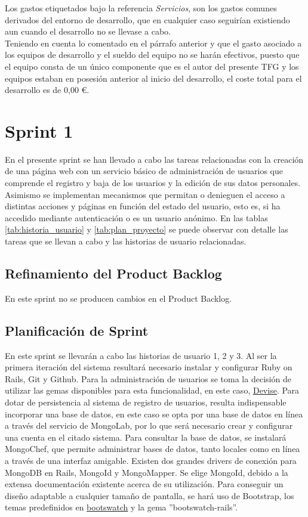 Los gastos etiquetados bajo la referencia \textit{Servicios}, son los gastos comunes derivados del entorno de desarrollo, que en cualquier caso seguirían existiendo aun cuando el desarrollo no se llevase a cabo.
\\Teniendo en cuenta lo comentado en el párrafo anterior y que el gasto asociado a los equipos de desarrollo y el sueldo del equipo no se harán efectivos, puesto que el equipo consta de un único componente que es el autor del presente \ac{TFG} y los equipos estaban en posesión anterior al inicio del desarrollo, el coste total para el desarrollo es de 0,00 \euro.


\section{Sprint 1}
En el presente sprint se han llevado a cabo las tareas relacionadas con la creación de una página web con un servicio básico de administración de usuarios que comprende el registro y baja de los usuarios y la edición de sus datos personales. Asimismo se implementan mecanismos que permitan o denieguen el acceso a distintas acciones y páginas en función del estado del usuario, esto es, si ha accedido mediante autenticación o es un usuario anónimo. En las tablas \ref{tab:historia_usuario} y \ref{tab:plan_proyecto} se puede observar con detalle las tareas que se llevan a cabo y las historias de usuario relacionadas.

	\subsection{Refinamiento del Product Backlog}
	En este sprint no se producen cambios en el Product Backlog.
	
	\subsection{Planificación de Sprint}
	En este sprint se llevarán a cabo las historias de usuario 1, 2 y 3. Al ser la primera iteración del sistema resultará necesario instalar y configurar Ruby on Rails, Git y Github. Para la administración de usuarios se toma la decisión de utilizar las gemas disponibles para esta funcionalidad, en este caso, \href{https://github.com/plataformatec/devise}{Devise}. Para dotar de persistencia al sistema de registro de usuarios, resulta indispensable incorporar una base de datos, en este caso se opta por una base de datos en línea a través del servicio de MongoLab, por lo que será necesario crear y configurar una cuenta en el citado sistema. Para consultar la base de datos, se instalará MongoChef, que permite administrar bases de datos, tanto locales como en línea a través de una interfaz amigable. Existen dos grandes drivers de conexión para MongoDB en Rails, MongoId y MongoMapper. Se elige MongoId, debido a la extensa documentación existente acerca de su utilización. Para conseguir un diseño adaptable a cualquier tamaño de pantalla, se hará uso de Bootstrap, los temas predefinidos en \href{https://bootswatch.com/}{bootswatch} y la gema ''bootswatch-rails''.
	
